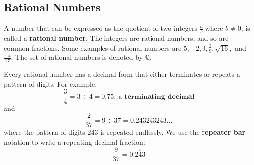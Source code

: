 \documentclass[10pt,]{book}
\newcommand{\terminology}[1]{\textbf{#1}}
\theoremstyle{plain}
\theoremstyle{definition}
\theoremstyle{definition}
\theoremstyle{definition}
\numberwithin{equation}{part}
\begin{document}
\subsection[{Rational Numbers}]{Rational Numbers}\label{subsection-60}
A number that can be expressed as the quotient of two integers \(\frac{a}{b} \) where \(b\ne 0\), is called a \terminology{rational number}. The integers are rational numbers, and so are common fractions. Some examples of rational numbers are \(5, −2, 0, \frac{2}{9} , \sqrt{16},\) and \(\frac{-4}{17} \). The set of rational numbers is denoted by \(\mathbb{Q} \).%
\par
Every rational number has a decimal form that either terminates or repeats a pattern of digits. For example,%
\begin{equation*}
\frac{3}{4}=3\div 4=0.75, ~\text{a }\textbf{terminating decimal}
\end{equation*}
and%
\begin{equation*}
\frac{2}{37}=9\div 37=0.243243243 \ldots
\end{equation*}
where the pattern of digits \(243\) is repeated endlessly. We use the \terminology{repeater bar} notation to write a repeating decimal fraction:%
\begin{equation*}
\frac{9}{37}= 0.\overline{243}
\end{equation*}
%
\typeout{************************************************}
\typeout{************************************************}
\end{document}
